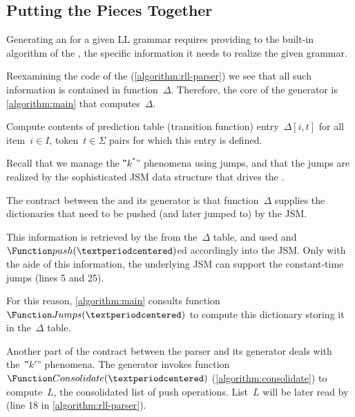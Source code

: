 \subsection{Putting the Pieces Together}
Generating an \RLLp for a given LL grammar requires providing to the
built-in algorithm of the \RLLp, the specific information it needs to
realize the given grammar.

Reexamining the code of the \RLLp (\cref{algorithm:rll-parser})
we see that all such information is contained in
function~$\Delta$.
Therefore, the core of the \RLLp generator is
\cref{algorithm:main} that computes~$\Delta$.

\begin{algorithm}[H]
  \caption{\label{algorithm:main}
    Compute contents of prediction table
    (transition function) entry~$Δ[i,t]$
    for all item~$i∈I$, token~$t ∈Σ$ pairs
    for which this entry is defined.
  }
  \begin{algorithmic}
     
        \CONTINUE {}
      \FI
           
           
        \FI
      \ENDFOR %
    \ENDFOR %
  \end{algorithmic}
\end{algorithm}

Recall that we manage the ‟$k^*$” phenomena using jumps, and that the
jumps are realized by the sophisticated JSM data structure that drives the
\RLLp.

The contract between the \RLLp and its generator is that function~$\Delta$
supplies the dictionaries that need to be pushed (and later jumped to)
by the JSM.

This information is retrieved by the \RLLp from the~$\Delta$ table,
and used and~$\Function push(·)$ed accordingly into the JSM.
Only with the aide of this information, the underlying JSM can support the
constant-time jumps (lines 5 and 25).

For this reason, \cref{algorithm:main} consults function~$\Function Jumps(·)$
to compute this dictionary storing it in the~$\Delta$ table.

Another part of the contract between the parser and its generator deals
with the~‟$k'$” phenomena. The generator invokes function~$\Function
Consolidate(·)$ (\cref{algorithm:consolidate}) to
compute~$L$, the consolidated list of push operations. List~$L$ will be later
read by \RLLp (line 18 in \cref{algorithm:rll-parser}).
